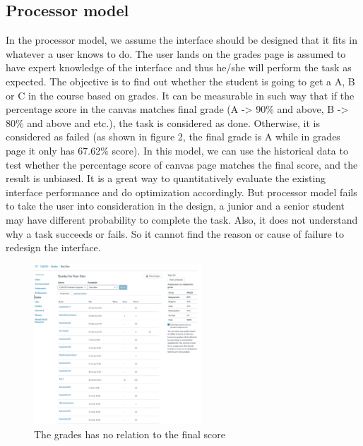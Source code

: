 \documentclass[
	letterpaper, %
]{jdf}
\begin{document}
\subsection{Processor model}
In the processor model, we assume the interface should be designed that it fits in whatever a user knows to do. The user lands on the grades page is assumed to have expert knowledge of the interface and thus he/she will perform the task as expected. The objective is to find out whether the student is going to get a A, B or C in the course based on grades. It can be measurable in such way that if the percentage score in the canvas matches final grade (A -> 90\% and above, B -> 80\% and above and etc.), the task is considered as done. Otherwise, it is considered as failed (as shown in figure 2, the final grade is A while in grades page it only has 67.62\% score). In this model, we can use the historical data to test whether the percentage score of canvas page matches the final score, and the result is unbiased. It is a great way to quantitatively evaluate the existing interface performance and do optimization accordingly. But processor model fails to take the user into consideration in the design, a junior and a senior student may have different probability to complete the task. Also, it does not understand why a task succeeds or fails. So it cannot find the reason or cause of failure to redesign the interface.

\begin{figure}[h]
	\centering
	\includegraphics[height=6cm]{Figures/canvas_grades.png}
	\caption{The grades has no relation to the final score}
	\label{fig:canvas_grades}
\end{figure}
\end{document}
